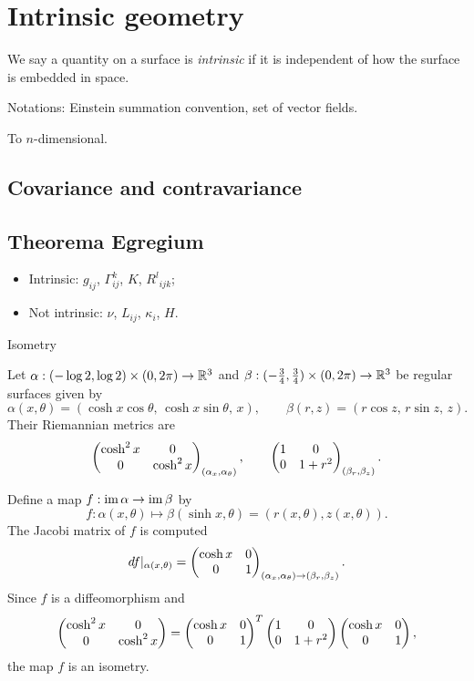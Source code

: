 \documentclass{../note}
\def\a{\alpha}
\begin{document}
\chapter{Intrinsic geometry}

We say a quantity on a surface is \emph{intrinsic} if it is independent of how the surface is embedded in space.

Notations: Einstein summation convention, set of vector fields.

To $n$-dimensional.

\section{Covariance and contravariance}


\section{Theorema Egregium}

\begin{itemize}
\item Intrinsic: $g_{ij}$, $\Gamma_{ij}^k$, $K$, ${R^l}_{ijk}$;
\item Not intrinsic: $\nu$, $L_{ij}$, $\kappa_i$, $H$.
\end{itemize}

Isometry
\begin{ex}
Let $\a:(-\log2,\log2)\times(0,2\pi)\to\R^3$ and $\beta:(-\frac34,\frac34)\times(0,2\pi)\to\mathbb{R}^3$ be regular surfaces given by
\[\a(x,\theta)=(\cosh x\cos\theta,\,\cosh x\sin\theta,\,x),\qquad
\beta(r,z)=(r\cos z,\,r\sin z,\,z).\]
Their Riemannian metrics are
\[\mat{\cosh^2x&0\\0&\cosh^2x}_{(\a_x,\a_\theta)},\qquad\mat{1&0\\0&1+r^2}_{(\beta_r,\beta_z)}.\]

Define a map $f:\im\a\to\im\beta$ by
\[f:\a(x,\theta)\mapsto\beta(\sinh x,\theta)=(r(x,\theta),z(x,\theta)).\]
The Jacobi matrix of $f$ is computed
\[df|_{\a(x,\theta)}=\mat{\cosh x&0\\0&1}_{(\a_x,\a_\theta)\to(\beta_r,\beta_z)}.\]
Since $f$ is a diffeomorphism and
\[\begin{pmatrix}\cosh^2x&0\\0&\cosh^2x\end{pmatrix}=\begin{pmatrix}\cosh x&0\\0&1\end{pmatrix}^T\begin{pmatrix}1&0\\0&1+r^2\end{pmatrix}\begin{pmatrix}\cosh x&0\\0&1\end{pmatrix},\]
the map $f$ is an isometry.
\end{ex}
\end{document}
